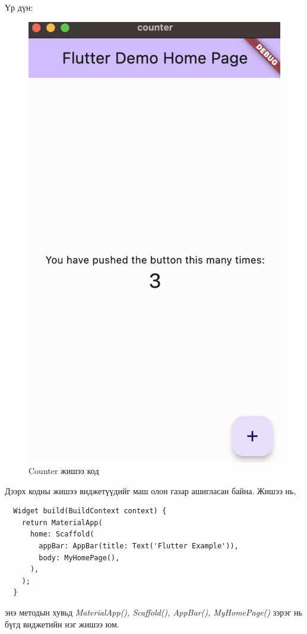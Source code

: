 Үр дүн:
\clearpage
\begin{figure}[h]
	\centering
	\includegraphics{images/counter.png}
	\caption{Counter жишээ код}
	\label{fig:modalform}
\end{figure}
\clearpage
Дээрх кодны жишээ виджетүүдийг маш олон газар ашигласан байна. Жишээ нь,
\begin{lstlisting}
  Widget build(BuildContext context) {
    return MaterialApp(
      home: Scaffold(
        appBar: AppBar(title: Text('Flutter Example')),
        body: MyHomePage(),
      ),
    );
  }
\end{lstlisting}
энэ методын хувьд \emph{MaterialApp(), Scaffold(), AppBar(), MyHomePage()} зэрэг нь бүгд виджетийн нэг жишээ юм.

